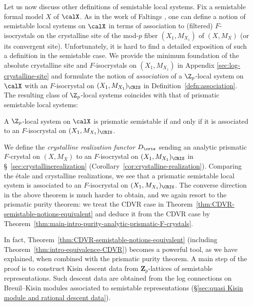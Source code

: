 Let us now discuss other definitions of semistable local systems. Fix a semistable formal model $X$ of $\calX$. As in the work of Faltings \cite{Faltings-CryscohandGalrep}, one can define a notion of semistable local systems on $\calX$ in terms of association to (filtered) $F$-isocrystals on the crystalline site of the mod-$p$ fiber $(X_1,M_{X_1})$ of $(X,M_X)$ (or its convergent site). Unfortunately, it is hard to find a detailed exposition of such a definition in the semistable case. We provide the minimum foundation of the absolute crystalline site and $F$-isocrystals on $(X_1,M_{X_1})$ in Appendix \ref{sec:log-crystalline-site} and formulate the notion of \emph{association} of a $\Z_p$-local system on $\calX$ with an $F$-isocrystal on $(X_1,M_{X_1})_\CRIS$ in Definition~\ref{defn:association}. The resulting class of $\Z_p$-local systems coincides with that of prismatic semistable local systems:

\begin{thm} 
A $\Z_p$-local system on $\calX$ is prismatic semistable if and only if it is associated to an $F$-isocrystal on $(X_1,M_{X_1})_\CRIS$.
\end{thm}

We define the \emph{crystalline realization functor} $D_\cris$ sending an analytic prismatic $F$-crystal on $(X,M_X)$ to an $F$-isocrystal on $(X_1,M_{X_1})_\CRIS$ in \S~\ref{sec:crystallinerealization} (Corollary~\ref{cor:crystalline-realization}). Comparing the \'etale and crystalline realizations, we see that a prismatic semistable local system is associated to an $F$-isocrystal on $(X_1,M_{X_1})_\CRIS$. The converse direction in the above theorem is much harder to obtain, and we again resort to the prismatic purity theorem: we treat the CDVR case in Theorem~\ref{thm:CDVR-semistable-notions-equivalent} and deduce it from the CDVR case by Theorem~\ref{thm:main-intro-purity-analytic-prismatic-F-crystals}. 

In fact, Theorem~\ref{thm:CDVR-semistable-notions-equivalent} (including Theorem~\ref{thm:intro-equivalence-CDVR}) becomes a powerful tool, as we have explained, when combined with the prismatic purity theorem. A main step of the proof is to construct Kisin descent data from $\mathbf{Z}_p$-lattices of semistable representations. Such descent data are obtained from the log connections on Breuil--Kisin modules associated to semistable representations (\S\ref{sec:quasi Kisin module and rational descent data}).  

